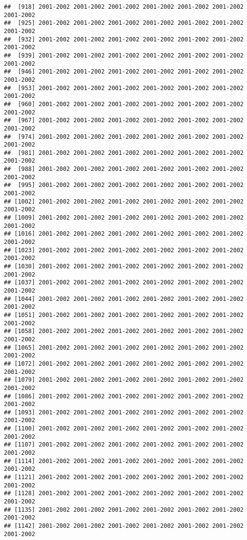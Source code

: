 \documentclass[
]{article}
\begin{document}
\begin{verbatim}
##  [918] 2001-2002 2001-2002 2001-2002 2001-2002 2001-2002 2001-2002 2001-2002
##  [925] 2001-2002 2001-2002 2001-2002 2001-2002 2001-2002 2001-2002 2001-2002
##  [932] 2001-2002 2001-2002 2001-2002 2001-2002 2001-2002 2001-2002 2001-2002
##  [939] 2001-2002 2001-2002 2001-2002 2001-2002 2001-2002 2001-2002 2001-2002
##  [946] 2001-2002 2001-2002 2001-2002 2001-2002 2001-2002 2001-2002 2001-2002
##  [953] 2001-2002 2001-2002 2001-2002 2001-2002 2001-2002 2001-2002 2001-2002
##  [960] 2001-2002 2001-2002 2001-2002 2001-2002 2001-2002 2001-2002 2001-2002
##  [967] 2001-2002 2001-2002 2001-2002 2001-2002 2001-2002 2001-2002 2001-2002
##  [974] 2001-2002 2001-2002 2001-2002 2001-2002 2001-2002 2001-2002 2001-2002
##  [981] 2001-2002 2001-2002 2001-2002 2001-2002 2001-2002 2001-2002 2001-2002
##  [988] 2001-2002 2001-2002 2001-2002 2001-2002 2001-2002 2001-2002 2001-2002
##  [995] 2001-2002 2001-2002 2001-2002 2001-2002 2001-2002 2001-2002 2001-2002
## [1002] 2001-2002 2001-2002 2001-2002 2001-2002 2001-2002 2001-2002 2001-2002
## [1009] 2001-2002 2001-2002 2001-2002 2001-2002 2001-2002 2001-2002 2001-2002
## [1016] 2001-2002 2001-2002 2001-2002 2001-2002 2001-2002 2001-2002 2001-2002
## [1023] 2001-2002 2001-2002 2001-2002 2001-2002 2001-2002 2001-2002 2001-2002
## [1030] 2001-2002 2001-2002 2001-2002 2001-2002 2001-2002 2001-2002 2001-2002
## [1037] 2001-2002 2001-2002 2001-2002 2001-2002 2001-2002 2001-2002 2001-2002
## [1044] 2001-2002 2001-2002 2001-2002 2001-2002 2001-2002 2001-2002 2001-2002
## [1051] 2001-2002 2001-2002 2001-2002 2001-2002 2001-2002 2001-2002 2001-2002
## [1058] 2001-2002 2001-2002 2001-2002 2001-2002 2001-2002 2001-2002 2001-2002
## [1065] 2001-2002 2001-2002 2001-2002 2001-2002 2001-2002 2001-2002 2001-2002
## [1072] 2001-2002 2001-2002 2001-2002 2001-2002 2001-2002 2001-2002 2001-2002
## [1079] 2001-2002 2001-2002 2001-2002 2001-2002 2001-2002 2001-2002 2001-2002
## [1086] 2001-2002 2001-2002 2001-2002 2001-2002 2001-2002 2001-2002 2001-2002
## [1093] 2001-2002 2001-2002 2001-2002 2001-2002 2001-2002 2001-2002 2001-2002
## [1100] 2001-2002 2001-2002 2001-2002 2001-2002 2001-2002 2001-2002 2001-2002
## [1107] 2001-2002 2001-2002 2001-2002 2001-2002 2001-2002 2001-2002 2001-2002
## [1114] 2001-2002 2001-2002 2001-2002 2001-2002 2001-2002 2001-2002 2001-2002
## [1121] 2001-2002 2001-2002 2001-2002 2001-2002 2001-2002 2001-2002 2001-2002
## [1128] 2001-2002 2001-2002 2001-2002 2001-2002 2001-2002 2001-2002 2001-2002
## [1135] 2001-2002 2001-2002 2001-2002 2001-2002 2001-2002 2001-2002 2001-2002
## [1142] 2001-2002 2001-2002 2001-2002 2001-2002 2001-2002 2001-2002 2001-2002

\end{verbatim}
\end{document}
